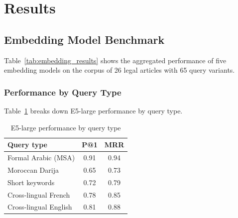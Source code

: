 \section{Results}

\subsection{Embedding Model Benchmark}

Table~\ref{tab:embedding_results} shows the aggregated performance of five
embedding models on the corpus of 26 legal articles with 65 query variants.

\begin{table}[H]
\centering
\caption{Embedding model benchmark results}
\label{tab:embedding_results}
\end{table}

\subsubsection{Performance by Query Type}

Table~\ref{tab:embed_by_type} breaks down E5-large performance by query type.

\begin{table}[H]
\centering
\caption{E5-large performance by query type}
\label{tab:embed_by_type}
\begin{tabular}{lcc}
\toprule
\textbf{Query type} & \textbf{P@1} & \textbf{MRR} \\
\midrule
Formal Arabic (MSA) & 0.91 & 0.94 \\
Moroccan Darija     & 0.65 & 0.73 \\
Short keywords      & 0.72 & 0.79 \\
Cross-lingual French & 0.78 & 0.85 \\
Cross-lingual English & 0.81 & 0.88 \\
\bottomrule
\end{tabular}
\end{table}

